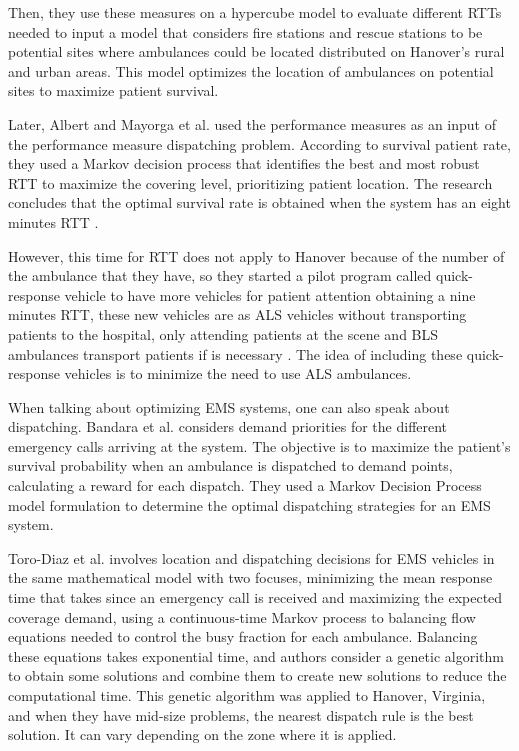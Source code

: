 Then, they use these measures on a hypercube model to evaluate different RTTs needed to input a model that considers fire stations and rescue stations to be potential sites where ambulances could be located distributed on Hanover's rural and urban areas. This model optimizes the location of ambulances on potential sites to maximize patient survival. 

Later, Albert and Mayorga et al. used the performance measures as an input of the performance measure dispatching problem. According to survival patient rate, they used a Markov decision process that identifies the best and most robust RTT to maximize the covering level, prioritizing patient location. The research concludes that the optimal survival rate is obtained when the system has an eight minutes RTT \cite{mclay2011evaluating}. 

However, this time for RTT does not apply to Hanover because of the number of the ambulance that they have, so they started a pilot program called quick-response vehicle to have more vehicles for patient attention obtaining a nine minutes RTT, these new vehicles are as ALS vehicles without transporting patients to the hospital, only attending patients at the scene and BLS ambulances transport patients if is necessary \cite{mclay2012hanover}. The idea of including these quick-response vehicles is to minimize the need to use ALS ambulances.

When talking about optimizing EMS systems, one can also speak about dis\-pat\-ching. Bandara et al. \cite{bandara2012optimal} considers demand priorities for the different emergency calls arriving at the system. The objective is to maximize the patient's survival probability when an ambulance is dispatched to demand points, calculating a reward for each dispatch. They used a Markov Decision Process model formulation to determine the optimal dispatching strategies for an EMS system.

Toro-Diaz et al. \cite{toro2013joint} involves location and dispatching decisions for EMS vehicles in the same mathematical model with two focuses, minimizing the mean response time that takes since an emergency call is received and maximizing the expected coverage demand, using a continuous-time Markov process to balancing flow equations needed to control the busy fraction for each ambulance. Balancing these equations takes exponential time, and authors consider a genetic algorithm to obtain some solutions and combine them to create new solutions to reduce the computational time. This genetic algorithm was applied to Hanover, Virginia, and when they have mid-size problems, the nearest dispatch rule is the best solution. It can vary depending on the zone where it is applied.

